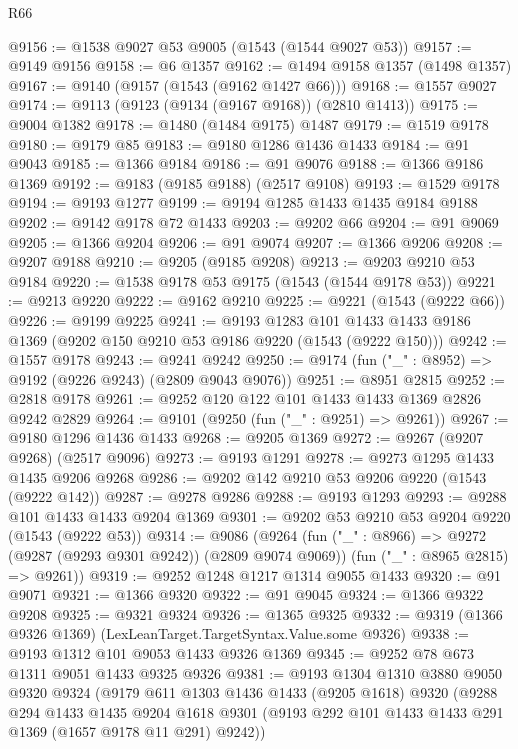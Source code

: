 \begin{lexlean}{R66}
\begin{coremodule}
@9156 := @1538 @9027 @53 @9005 (@1543 (@1544 @9027 @53))
@9157 := @9149 @9156
@9158 := @6 @1357
@9162 := @1494 @9158 @1357 (@1498 @1357)
@9167 := @9140 (@9157 (@1543 (@9162 @1427 @66)))
@9168 := @1557 @9027
@9174 := @9113 (@9123 (@9134 (@9167 @9168)) (@2810 @1413))
@9175 := @9004 @1382
@9178 := @1480 (@1484 @9175) @1487
@9179 := @1519 @9178
@9180 := @9179 @85
@9183 := @9180 @1286 @1436 @1433
@9184 := @91 @9043
@9185 := @1366 @9184
@9186 := @91 @9076
@9188 := @1366 @9186 @1369
@9192 := @9183 (@9185 @9188) (@2517 @9108)
@9193 := @1529 @9178
@9194 := @9193 @1277
@9199 := @9194 @1285 @1433 @1435 @9184 @9188
@9202 := @9142 @9178 @72 @1433
@9203 := @9202 @66
@9204 := @91 @9069
@9205 := @1366 @9204
@9206 := @91 @9074
@9207 := @1366 @9206
@9208 := @9207 @9188
@9210 := @9205 (@9185 @9208)
@9213 := @9203 @9210 @53 @9184
@9220 := @1538 @9178 @53 @9175 (@1543 (@1544 @9178 @53))
@9221 := @9213 @9220
@9222 := @9162 @9210
@9225 := @9221 (@1543 (@9222 @66))
@9226 := @9199 @9225
@9241 := @9193
    @1283
    @101
    @1433
    @1433
    @9186
    @1369
    (@9202 @150 @9210 @53 @9186 @9220 (@1543 (@9222 @150)))
@9242 := @1557 @9178
@9243 := @9241 @9242
@9250 := @9174 (fun ("_" : @8952) => @9192 (@9226 @9243) (@2809 @9043 @9076))
@9251 := @8951 @2815
@9252 := @2818 @9178
@9261 := @9252 @120 @122 @101 @1433 @1433 @1369 @2826 @9242 @2829
@9264 := @9101 (@9250 (fun ("_" : @9251) => @9261))
@9267 := @9180 @1296 @1436 @1433
@9268 := @9205 @1369
@9272 := @9267 (@9207 @9268) (@2517 @9096)
@9273 := @9193 @1291
@9278 := @9273 @1295 @1433 @1435 @9206 @9268
@9286 := @9202 @142 @9210 @53 @9206 @9220 (@1543 (@9222 @142))
@9287 := @9278 @9286
@9288 := @9193 @1293
@9293 := @9288 @101 @1433 @1433 @9204 @1369
@9301 := @9202 @53 @9210 @53 @9204 @9220 (@1543 (@9222 @53))
@9314 := @9086
    (@9264
      (fun ("_" : @8966) => @9272 (@9287 (@9293 @9301 @9242)) (@2809 @9074 @9069))
      (fun ("_" : @8965 @2815) => @9261))
@9319 := @9252 @1248 @1217 @1314 @9055 @1433
@9320 := @91 @9071
@9321 := @1366 @9320
@9322 := @91 @9045
@9324 := @1366 @9322 @9208
@9325 := @9321 @9324
@9326 := @1365 @9325
@9332 := @9319 (@1366 @9326 @1369) (LexLeanTarget.TargetSyntax.Value.some @9326)
@9338 := @9193 @1312 @101 @9053 @1433 @9326 @1369
@9345 := @9252 @78 @673 @1311 @9051 @1433 @9325 @9326
@9381 := @9193
    @1304
    @1310
    @3880
    @9050
    @9320
    @9324
    (@9179
      @611
      @1303
      @1436
      @1433
      (@9205 @1618)
      @9320
      (@9288
        @294
        @1433
        @1435
        @9204
        @1618
        @9301
        (@9193 @292 @101 @1433 @1433 @291 @1369 (@1657 @9178 @11 @291) @9242))

\end{coremodule}
\end{lexlean}
